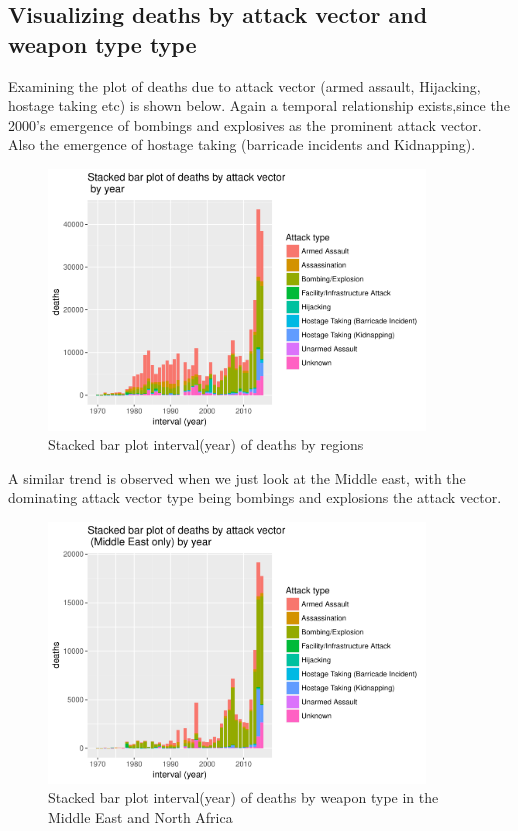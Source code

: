 \subsection{Visualizing deaths by attack vector and weapon type
type}\label{viewing-deaths-by-attack-vector-type}

Examining the plot of deaths due to attack vector (armed assault,
Hijacking, hostage taking etc) is shown below. Again a temporal
relationship exists,since the 2000's emergence of bombings and explosives
as the prominent attack vector. Also the emergence of hostage taking
(barricade incidents and Kidnapping).

\begin{figure}[t]
\includegraphics[width=10cm]{Peters_experiment_markdown_files/figure-latex/unnamed-chunk-7-1.pdf}
\caption{Stacked bar plot interval(year) of deaths by regions}
\label{fig:stackbaryearattackvector1}
\centering
\end{figure}

A similar trend is observed when we just look at the Middle east, with the dominating attack vector type being bombings and explosions the attack vector.

\begin{figure}[t]
\includegraphics[width=10cm]{Peters_experiment_markdown_files/figure-latex/unnamed-chunk-8-1.pdf}
\caption{Stacked bar plot interval(year) of deaths by weapon type in the Middle East and North Africa}
\label{fig:stackbaryearattackvectormideast}
\centering
\end{figure}

